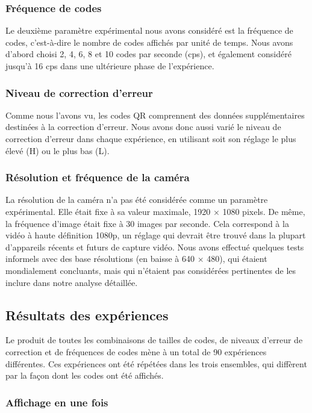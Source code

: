\subsubsection{Fréquence de codes}

Le deuxième paramètre expérimental nous avons considéré est la fréquence de codes, c'est-à-dire le nombre de codes affichés par unité de temps. Nous avons d'abord choisi 2, 4, 6, 8 et 10 codes par seconde (cps), et également considéré jusqu'à 16 cps dans une ultérieure phase de l'expérience.

\subsubsection{Niveau de correction d'erreur}

Comme nous l'avons vu, les codes QR comprennent des données supplémentaires destinées à la correction d'erreur. Nous avons donc aussi varié le niveau de correction d'erreur dans chaque expérience, en utilisant soit son réglage le plus élevé (H) ou le plus bas (L).

\subsubsection{Résolution et fréquence de la caméra}

La résolution de la caméra n'a pas été considérée comme un paramètre expérimental. Elle était fixe à sa valeur maximale, 1920 $\times$ 1080 pixels. De même, la fréquence d'image était fixe à 30 images par seconde. Cela correspond à la vidéo à haute définition 1080p, un réglage qui devrait être trouvé dans la plupart d'appareils récents et futurs de capture vidéo. Nous avons effectué quelques tests informels avec des base résolutions (en baisse à 640 $\times$ 480), qui étaient mondialement concluants, mais qui n'étaient pas considérées pertinentes de les inclure dans notre analyse détaillée.

\subsection{Résultats des expériences}

Le produit de toutes les combinaisons de tailles de codes, de niveaux d'erreur de correction et de fréquences de codes mène à un total de 90 expériences différentes. Ces expériences ont été répétées dans les trois ensembles, qui diffèrent par la façon dont les codes ont été affichés.

\subsubsection{Affichage en une fois}


